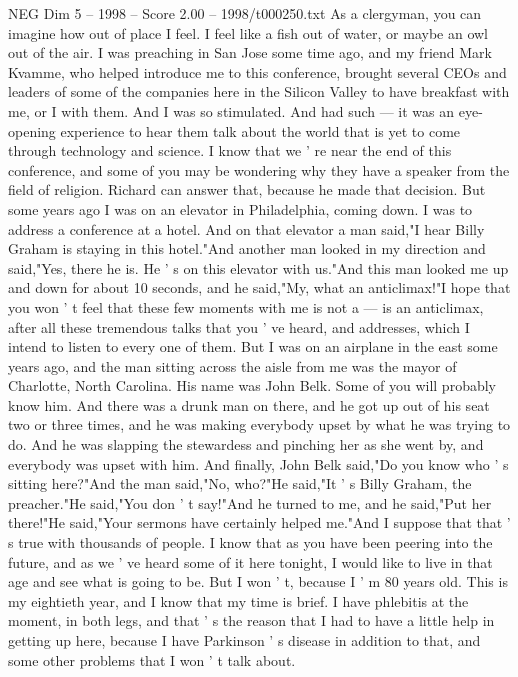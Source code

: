 \begin{textsample}{NEG Dim 5 – 1998 – Score 2.00 – 1998/t000250.txt}  \label{ex:f5_neg_071}
As a clergyman, you can imagine how out of place I feel.
I feel like a fish out of water, or maybe an owl out of the air.
I was preaching in San Jose some time ago, and my friend Mark Kvamme, who helped introduce me to this conference, brought several CEOs and leaders of some of the companies here in the Silicon Valley to have breakfast with me, or I with them.
And I was so stimulated.
And had such — it was an eye-opening experience to hear them talk about the world that is yet to come through technology and science.
I know that we ' re near the end of this conference, and some of you may be wondering why they have a speaker from the field of religion.
Richard can answer that, because he made that decision.
But some years ago I was on an elevator in Philadelphia, coming down.
I was to address a conference at a hotel.
And on that elevator a man said,"I hear Billy Graham is staying in this hotel."And another man looked in my direction and said,"Yes, there he is.
He ' s on this elevator with us."And this man looked me up and down for about 10 seconds, and he said,"My, what an anticlimax!"I hope that you won ' t feel that these few moments with me is not a — is an anticlimax, after all these tremendous talks that you ' ve heard, and addresses, which I intend to listen to every one of them.
But I was on an airplane in the east some years ago, and the man sitting across the aisle from me was the mayor of Charlotte, North Carolina.
His name was John Belk.
Some of you will probably know him.
And there was a drunk man on there, and he got up out of his seat two or three times, and he was making everybody upset by what he was trying to do.
And he was slapping the stewardess and pinching her as she went by, and everybody was upset with him.
And finally, John Belk said,"Do you know who ' s sitting here?"And the man said,"No, who?"He said,"It ' s Billy Graham, the preacher."He said,"You don ' t say!"And he turned to me, and he said,"Put her there!"He said,"Your sermons have certainly helped me."And I suppose that that ' s true with thousands of people.
I know that as you have been peering into the future, and as we ' ve heard some of it here tonight, I would like to live in that age and see what is going to be.
But I won ' t, because I ' m 80 years old.
This is my eightieth year, and I know that my time is brief.
I have phlebitis at the moment, in both legs, and that ' s the reason that I had to have a little help in getting up here, because I have Parkinson ' s disease in addition to that, and some other problems that I won ' t talk about.

\end{textsample}
